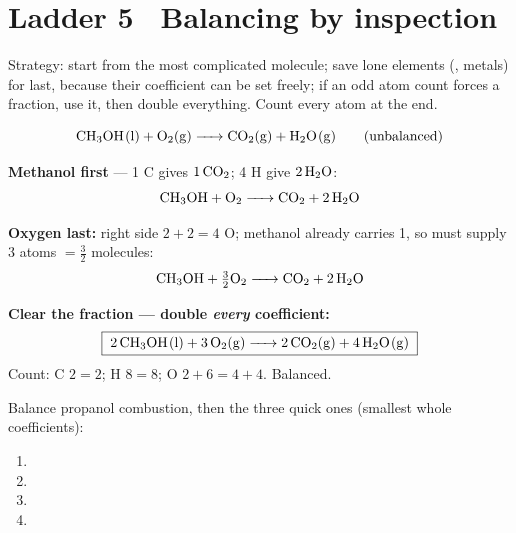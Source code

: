 \documentclass{apchem-worksheet}
\begin{document}
\section*{\sffamily Ladder 5 \textbullet\ Balancing by inspection}

Strategy: start from the most complicated molecule; save lone elements
(, metals) for last, because their coefficient can be set freely;
if an odd atom count forces a fraction, use it, then double everything.
Count every atom at the end.

\begin{workedexample}
\[ \ce{CH3OH(l) + O2(g) -> CO2(g) + H2O(g)} \qquad\text{(unbalanced)} \]

\textbf{Methanol first} --- 1 C gives $1\,\ce{CO2}$; 4 H give
$2\,\ce{H2O}$:
\[ \ce{CH3OH + O2 -> CO2 + 2H2O} \]

\textbf{Oxygen last:} right side $2 + 2 = 4$ O; methanol already carries
1, so  must supply 3 atoms $= \tfrac{3}{2}$ molecules:
\[ \ce{CH3OH + \tfrac{3}{2}O2 -> CO2 + 2H2O} \]

\textbf{Clear the fraction --- double \emph{every} coefficient:}
\[ \boxed{\;\ce{2CH3OH(l) + 3O2(g) -> 2CO2(g) + 4H2O(g)}\;} \]
Count: C $2 = 2$; H $8 = 8$; O $2 + 6 = 4 + 4$. Balanced.
\end{workedexample}

\begin{yourturn}
Balance propanol combustion, then the three quick ones (smallest whole
coefficients):
\begin{enumerate}[leftmargin=*,itemsep=0.35em]
  \item {} \workspace[2cm]
  \item {}
  \item {}
  \item {}
\end{enumerate}
\end{yourturn}
\end{document}
